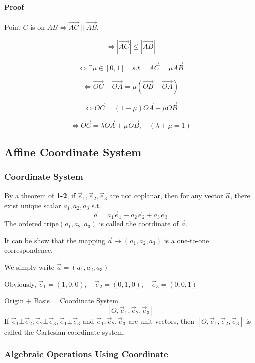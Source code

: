 \documentclass[UTF8]{ctexart}
\begin{document}
\paragraph{Proof}

Point $C$ is on $AB \iff \overrightarrow{AC} \parallel \overrightarrow{AB}$.

$$
\iff |\overrightarrow{AC}|\leq |\overrightarrow{AB}| 
$$

$$
\iff \exists \mu \in [0,1]  \quad s.t. \quad  \overrightarrow{AC}= \mu \overrightarrow{AB} 
$$

$$
\iff \overrightarrow {OC}-\overrightarrow {OA} = \mu (\overrightarrow{OB}- \overrightarrow{OA}) 
$$

$$
\iff \overrightarrow{OC} = (1-\mu)\overrightarrow{OA}+\mu \overrightarrow{OB}
$$

$$
\iff \overrightarrow{OC} = \lambda \overrightarrow{OA}+ \mu \overrightarrow{OB},\quad (\lambda + \mu  = 1)
$$




\subsection{Affine Coordinate System}

\subsubsection{ Coordinate System }

By a theorem of \textbf{1-2}, if $\vec e_1,\vec e_2,\vec e_3$ are not coplanar, then for any vector $\vec a$, there exist unique scalar $a_1,a_2,a_3$ s.t.
$$
\vec a  = a_1 \vec e_1+ a_2 \vec e_2 + a_3\vec e_3
$$
The ordered tripe$(a_1,a_2,a_3)$ is called the coordinate of $\vec a $.

It can be show that the mapping $\vec a \mapsto   (a_1,a_2,a_3)$ is a one-to-one  correspondence.

We simply write $\vec a  = (a_1,a_2,a_3)$ 

Obviously, $\vec e_1 = (1,0,0),\quad \vec e_2 = (0,1,0), \quad \vec e_3 = (0,0,1)$

Origin + Basis = Coordinate System
$$
[O,\vec e_1,\vec e_2,\vec e_3]
$$
If $\vec e_1 \bot \vec e_2, \vec e_2 \bot \vec e_3, \vec e_1 \bot \vec e_3$ and $\vec e_1,\vec e_2, \vec e_3$ are unit vectors, 
then $[O,\vec e_1,\vec e_2,\vec e_3]$ is called the Cartesian coordinate system.

\subsubsection{Algebraic Operations Using Coordinate}
\end{document}
